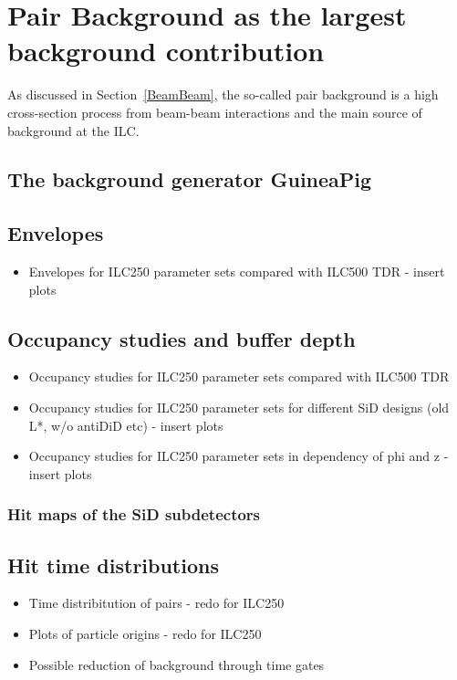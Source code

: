 \chapter{\electron \positron Pair Background as the largest background contribution}
\label{PairBkg}
As discussed in Section~\ref{BeamBeam}, the so-called pair background is a high cross-section process from beam-beam interactions and the main source of background at the ILC.


\section{The background generator GuineaPig}
\label{PairBkg:GuineaPig}

\section{Envelopes}
\label{PairBkg:helix}
\begin{itemize}
 \item Envelopes for ILC250 parameter sets compared with ILC500 TDR - insert plots
\end{itemize}

\section{Occupancy studies and buffer depth}
\label{PairBkg:occupancy}

\begin{itemize}
 \item Occupancy studies for ILC250 parameter sets compared with ILC500 TDR
 \item Occupancy studies for ILC250 parameter sets for different SiD designs (old L*, w/o antiDiD etc) - insert plots
 \item Occupancy studies for ILC250 parameter sets in dependency of phi and z - insert plots
\end{itemize}

\subsection{Hit maps of the SiD subdetectors}
\label{PairBkg:hitmaps}


\section{Hit time distributions}
\label{PairBkg:hittime}

\begin{itemize}
 \item Time distribitution of pairs - redo for ILC250
 \item Plots of particle origins - redo for ILC250
 \item Possible reduction of background through time gates
\end{itemize}

